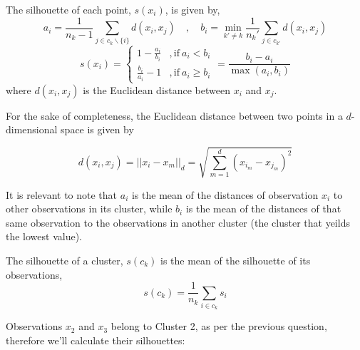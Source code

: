 \documentclass[12pt]{article}
\begin{document}
\begin{enumerate}[leftmargin=\labelsep]
\begin{enumerate}[resume]
                    The silhouette of each point, $s(x_i)$, is given by,
                    \begin{equation}\label{ex2b-ai-bi}
                        a_i = \frac{1}{n_k - 1} \sum_{j \in c_k \backslash \{i\}} d(x_i, x_j)
                        \quad,\quad
                        b_i = \min_{k' \ne k} \frac{1}{n_k'} \sum_{j \in c_{k'}} d(x_i, x_j)
                    \end{equation}
                    \begin{equation}\label{ex2b-s-xi}
                        s(x_i) = \begin{cases}
                            1-\frac{a_i}{b_i}   & , \text{if}~a_i < b_i    \\
                            \frac{b_i}{a_i} - 1 & , \text{if}~a_i \geq b_i
                        \end{cases}
                        =\frac{b_i - a_i}{\max(a_i,b_i)}
                    \end{equation}
                    where $d(x_i, x_j)$ is the Euclidean distance between $x_i$ and $x_j$.

                    For the sake of completeness, the Euclidean distance between two points in a $d$-dimensional
                    space is given by

                    $$
                        d(x_i, x_j) = ||x_i - x_m||_d = \sqrt{\sum_{m=1}^{d} \left(x_{i_m} - x_{j_m}\right)^2}
                    $$

                    It is relevant to note that $a_i$ is the mean of the distances of observation $x_i$ to other
                    observations in its cluster, while $b_i$ is the mean of the distances of
                    that same observation to the observations in another cluster (the cluster
                    that yeilds the lowest value).

                    The silhouette of a cluster, $s(c_k)$ is the mean of the silhouette of its observations,
                    \begin{equation}\label{ex2b-s-ck}
                        s(c_k) = \frac{1}{n_k} \sum_{i \in c_k} s_i
                    \end{equation}

                    Observations \textcolor{cblue}{$x_2$} and \textcolor{corange}{$x_3$}
                    belong to \colorbox{byellow}{Cluster 2}, as per the previous
                    question, therefore we'll calculate their silhouettes:


\end{enumerate}
\end{enumerate}
\end{document}
